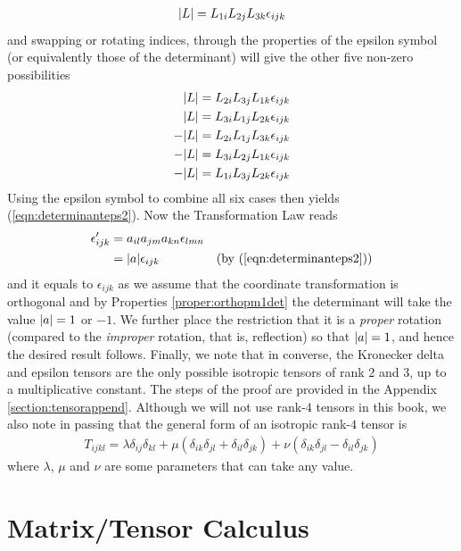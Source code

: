 \begin{align}
\abs{L} = L_{1i}L_{2j}L_{3k}\epsilon_{ijk} \label{eqn:determinanteps3}
\end{align}
and swapping or rotating indices, through the properties of the epsilon symbol (or equivalently those of the determinant) will give the other five non-zero possibilities
\begin{align*}
\abs{L} &= L_{2i}L_{3j}L_{1k}\epsilon_{ijk} \\
\abs{L} &= L_{3i}L_{1j}L_{2k}\epsilon_{ijk} \\
-\abs{L} &= L_{2i}L_{1j}L_{3k}\epsilon_{ijk} \\
-\abs{L} &= L_{3i}L_{2j}L_{1k}\epsilon_{ijk} \\
-\abs{L} &= L_{1i}L_{3j}L_{2k}\epsilon_{ijk}
\end{align*}
Using the epsilon symbol to combine all six cases then yields (\ref{eqn:determinanteps2}). Now the Transformation Law reads
\begin{align*}
\epsilon'_{ijk} &= a_{il}a_{jm}a_{kn}\epsilon_{lmn} \\
&= \abs{a}\epsilon_{ijk} & \text{(by (\ref{eqn:determinanteps2}))}
\end{align*}
and it equals to $\epsilon_{ijk}$ as we assume that the coordinate transformation is orthogonal and by Properties \ref{proper:orthopm1det} the determinant will take the value $\abs{a} = 1$ or $-1$. We further place the restriction that it is a \textit{proper} rotation (compared to the \textit{improper} rotation, that is, reflection) so that $\abs{a} = 1$, and hence the desired result follows. Finally, we note that in converse, the Kronecker delta and epsilon tensors are the only possible isotropic tensors of rank $2$ and $3$, up to a multiplicative constant. The steps of the proof are provided in the Appendix \ref{section:tensorappend}. Although we will not use rank-$4$ tensors in this book, we also note in passing that the general form of an isotropic rank-$4$ tensor is
\begin{align}
T_{ijkl}= \lambda \delta_{ij}\delta_{kl} + \mu(\delta_{ik}\delta_{jl} + \delta_{il}\delta_{jk}) + \nu(\delta_{ik}\delta_{jl}-\delta_{il}\delta_{jk})
\end{align}
where $\lambda$, $\mu$ and $\nu$ are some parameters that can take any value.

\section{Matrix/Tensor Calculus}

